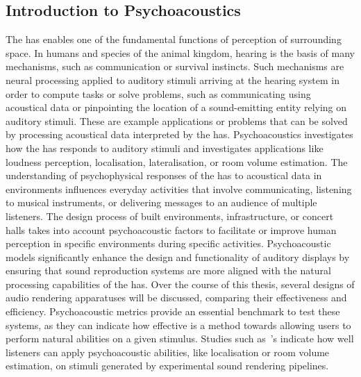\subsection{Introduction to Psychoacoustics}\label{sec:bg-psychoacoustics}
The \acrshort{has} enables one of the fundamental functions of perception of surrounding space. In humans and species of the animal kingdom, hearing is the basis of many mechanisms, such as communication or survival instincts. Such mechanisms are neural processing applied to auditory stimuli arriving at the hearing system in order to compute tasks or solve problems, such as communicating using acoustical data or pinpointing the location of a sound-emitting entity relying on auditory stimuli. These are example applications or problems that can be solved by processing acoustical data interpreted by the \acrshort{has}.
Psychoacoustics investigates how the \acrshort{has} responds to auditory stimuli and investigates applications like loudness perception, localisation, lateralisation, or room volume estimation. The understanding of psychophysical responses of the \acrshort{has} to acoustical data in environments influences everyday activities that involve communicating, listening to musical instruments, or delivering messages to an audience of multiple listeners. The design process of built environments, infrastructure, or concert halls takes into account psychoacoustic factors to facilitate or improve human perception in specific environments during specific activities.
Psychoacoustic models significantly enhance the design and functionality of auditory displays by ensuring that sound reproduction systems are more aligned with the natural processing capabilities of the \acrshort{has}. Over the course of this thesis, several designs of audio rendering apparatuses will be discussed, comparing their effectiveness and efficiency. Psychoacoustic metrics provide an essential benchmark to test these systems, as they can indicate how effective is a method towards allowing users to perform natural abilities on a given stimulus. Studies such as~\cite{rungta2016psychoacoustic}'s indicate how well listeners can apply psychoacoustic abilities, like localisation or room volume estimation, on stimuli generated by experimental sound rendering pipelines.


